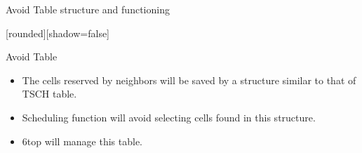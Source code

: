 \addtocounter{framenumber}{-1}
\begin{withoutheadline}
\begin{frame}{Avoid Table structure and functioning}


[rounded][shadow=false]
\begin{block}{Avoid Table}
    \begin{itemize}
     \item The cells reserved by neighbors will be saved by a structure similar to that of TSCH table. 
    \item<2-> Scheduling function will avoid selecting cells found in this structure. 
    \item<3-> 6top will manage this table.
    \end{itemize}
    \end{block}
    
    
\begin{figure}[p]

 
 
\end{figure}



\end{frame}
\end{withoutheadline}


